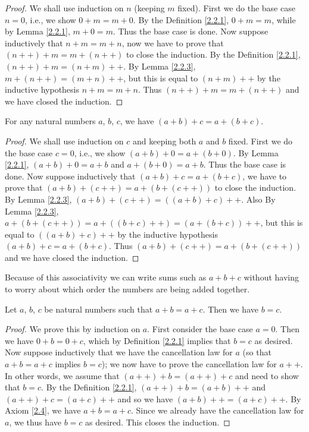 \begin{proof}
We shall use induction on \(n\) (keeping \(m\) fixed).
First we do the base case \(n = 0\), i.e., we show \(0 + m = m + 0\).
By the Definition \ref{2.2.1}, \(0 + m = m\), while by Lemma \ref{2.2.1}, \(m + 0 = m\).
Thus the base case is done.
Now suppose inductively that \(n + m = m + n\), now we have to prove that \((n++) + m = m + (n++)\) to close the induction.
By the Definition \ref{2.2.1}, \((n++) + m = (n + m)++\).
By Lemma \ref{2.2.3}, \(m + (n++) = (m + n)++\), but this is equal to \((n + m)++\) by the inductive hypothesis \(n+m=m+n\).
Thus \((n++) + m = m + (n++)\) and we have closed the induction.
\end{proof}

\begin{proposition}\label{2.2.5}
For any natural numbers \(a\), \(b\), \(c\), we have \((a + b) + c = a + (b + c)\).
\end{proposition}

\begin{proof}
We shall use induction on \(c\) and keeping both \(a\) and \(b\) fixed.
First we do the base case \(c = 0\), i.e., we show \((a + b) + 0 = a + (b + 0)\).
By Lemma \ref{2.2.1}, \((a + b) + 0 = a + b\) and \(a + (b + 0) = a + b\).
Thus the base case is done.
Now suppose inductively that \((a + b) + c = a + (b + c)\), we have to prove that \((a + b) + (c++) = a + (b + (c++))\) to close the induction.
By Lemma \ref{2.2.3}, \((a + b) + (c++) = ((a + b) + c)++\).
Also By Lemma \ref{2.2.3}, \(a + (b + (c++)) = a + ((b + c)++) = (a + (b + c))++\), but this is equal to \(((a + b) + c)++\) by the inductive hypothesis \((a + b) + c = a + (b + c)\).
Thus \((a + b) + (c++) = a + (b + (c++))\) and we have closed the induction.
\end{proof}

\begin{note}
Because of this associativity we can write sums such as \(a + b + c\) without having to worry about which order the numbers are being added together.
\end{note}

\begin{proposition}\label{2.2.6}
Let \(a\), \(b\), \(c\) be natural numbers such that \(a + b = a + c\).
Then we have \(b = c\).
\end{proposition}

\begin{proof}
We prove this by induction on \(a\).
First consider the base case \(a = 0\).
Then we have \(0 + b = 0 + c\), which by Definition \ref{2.2.1} implies that \(b = c\) as desired.
Now suppose inductively that we have the cancellation law for \(a\) (so that \(a + b = a + c\) implies \(b = c\));
we now have to prove the cancellation law for \(a++\).
In other words, we assume that \((a++) + b = (a++) + c\) and need to show that \(b = c\).
By the Definition \ref{2.2.1}, \((a++) + b = (a + b)++\) and \((a++) + c = (a + c)++\) and so we have \((a + b)++ = (a + c)++\).
By Axiom \ref{2.4}, we have \(a + b = a + c\).
Since we already have the cancellation law for \(a\), we thus have \(b = c\) as desired.
This closes the induction.
\end{proof}

